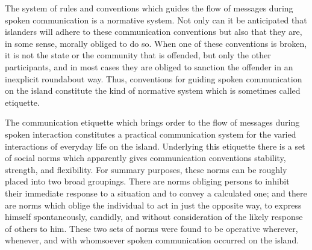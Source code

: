 \documentclass[twoside,symmetric,nobib,justified]{tufte-book}
\begin{document}
The system of rules and conventions which guides the flow of messages
during spoken communication is a normative system. Not only can it be
anticipated that islanders will adhere to these communication
conventions but also that they are, in some sense, morally obliged to do
so. When one of these conventions is broken, it is not the state or the
community that is offended, but only the other participants, and in most
cases they are obliged to sanction the offender in an inexplicit
roundabout way. Thus, conventions for guiding spoken communication on
the island constitute the kind of normative system which is sometimes
called etiquette.

The communication etiquette which brings order to the flow of messages
during spoken interaction constitutes a practical communication system
for the varied interactions of everyday life on the island. Underlying
this etiquette there is a set of social norms which apparently gives
communication conventions stability, strength, and flexibility. For
summary purposes, these norms can be roughly placed into two broad
groupings. There are norms obliging persons to inhibit their immediate
response to a situation and to convey a calculated one; and there are
norms which oblige the individual to act in just the opposite way, to
express himself spontaneously, candidly, and without consideration of
the likely response of others to him. These two sets of norms were found
to be operative wherever, whenever, and with whomsoever spoken
communication occurred on the island.
\end{document}
